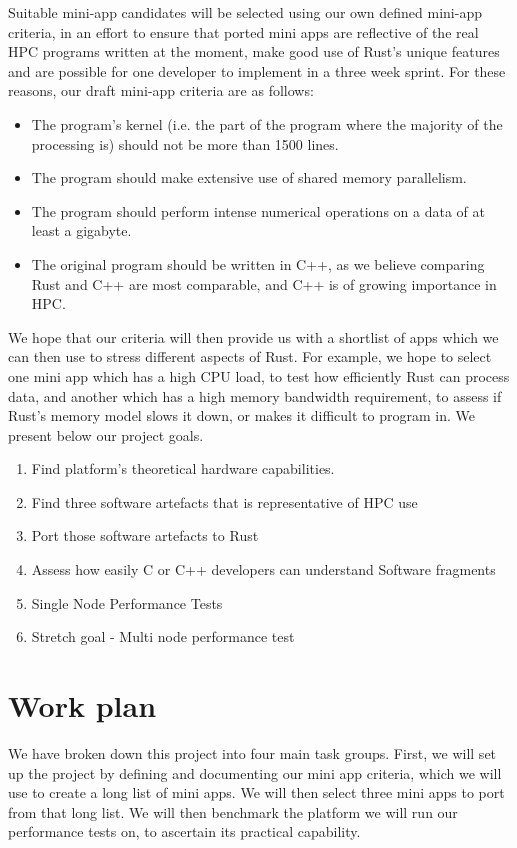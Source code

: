 \documentclass{report}[a4]
\begin{document}
Suitable mini-app candidates will be selected using our own defined mini-app criteria, in an effort to ensure that ported mini apps are reflective of the real HPC programs written at the moment, make good use of Rust's unique features and are possible for one developer to implement in a three week sprint. For these reasons, our draft mini-app criteria are as follows:

\begin{itemize}
  \item The program's kernel (i.e. the part of the program where the majority of the processing is) should not be more than 1500 lines.
  \item The program should make extensive use of shared memory parallelism.
  \item The program should perform intense numerical operations on a data of at least a gigabyte.
  \item The original program should be written in C++, as we believe comparing Rust and C++ are most comparable, and C++ is of growing importance in HPC.
\end{itemize}

We hope that our criteria will then provide us with a shortlist of apps which we can then use to stress different aspects of Rust. For example, we hope to select one mini app which has a high CPU load, to test how efficiently Rust can process data, and another which has a high memory bandwidth requirement, to assess if Rust's memory model slows it down, or makes it difficult to program in. We present below our project goals.

\begin{enumerate}
  \item Find platform's theoretical hardware capabilities.
  \item Find three software artefacts that is representative of HPC use
  \item Port those software artefacts to Rust
  \item Assess how easily C or C++ developers can understand Software fragments
  \item Single Node Performance Tests
  \item Stretch goal - Multi node performance test
\end{enumerate}
\chapter{Work plan} %
We have broken down this project into four main task groups. First, we will set up the project by defining and documenting our mini app criteria, which we will use to create a long list of mini apps. We will then select three mini apps to port from that long list. We will then benchmark the platform we will run our performance tests on, to ascertain its practical capability.
\end{document}
